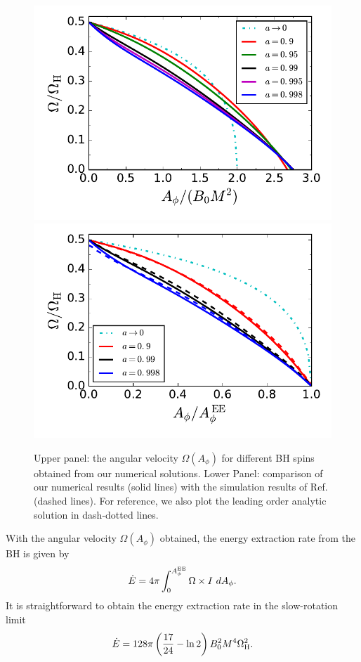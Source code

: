 \documentclass[aps,prd,reprint,nofootinbib, superscriptaddress]{revtex4-1}
\def\Ap{A_\phi}
\def\be{\begin{equation}}
\def\ee{\end{equation}}
\def\WH{\Omega_{\rm H}}
\def\AEE{A_\phi^{\rm EE}}
\begin{document}
\begin{figure}
\includegraphics[scale=0.7]{f2a}
\includegraphics[scale=0.7]{f2b}
\caption{\label{fig:omega} Upper panel: the angular velocity  $\Omega(\Ap)$ for different BH spins
obtained from our numerical solutions.
Lower Panel: comparison of our numerical results (solid lines) with the simulation results of
Ref.\cite{East2018} (dashed lines). For reference, we also plot the leading order analytic solution in
dash-dotted lines.}
\end{figure}


With the angular velocity $\Omega(\Ap)$ obtained, the energy extraction rate from the BH is given by
\be
\label{eq:Edot}
\dot E = 4\pi \int_0^{\AEE} \Omega \times I \ d \Ap.
\ee
It is straightforward to obtain the energy extraction rate in the slow-rotation limit
\be
\label{eq:lowEdot}
\dot E = 128\pi \left(\frac{17}{24}-\ln 2\right) B_0^2 M^4 \WH^2.
\ee
\end{document}
